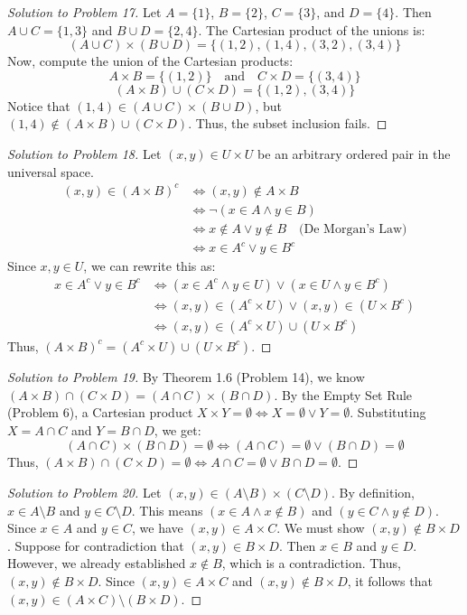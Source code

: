 \documentclass[11pt]{article}
\begin{document}
\begin{proof}[Solution to Problem 17]
Let $A = \{1\}$, $B = \{2\}$, $C = \{3\}$, and $D = \{4\}$.
Then $A \cup C = \{1, 3\}$ and $B \cup D = \{2, 4\}$.
The Cartesian product of the unions is:
\[ (A \cup C) \times (B \cup D) = \{(1,2), (1,4), (3,2), (3,4)\} \]
Now, compute the union of the Cartesian products:
\[ A \times B = \{(1,2)\} \quad \text{and} \quad C \times D = \{(3,4)\} \]
\[ (A \times B) \cup (C \times D) = \{(1,2), (3,4)\} \]
Notice that $(1,4) \in (A \cup C) \times (B \cup D)$, but $(1,4) \notin (A \times B) \cup (C \times D)$. Thus, the subset inclusion fails.
\end{proof}

\begin{proof}[Solution to Problem 18]
Let $(x,y) \in U \times U$ be an arbitrary ordered pair in the universal space.
\begin{align*}
(x,y) \in (A \times B)^c &\iff (x,y) \notin A \times B \\
&\iff \neg(x \in A \land y \in B) \\
&\iff x \notin A \lor y \notin B \quad \text{(De Morgan's Law)} \\
&\iff x \in A^c \lor y \in B^c
\end{align*}
Since $x, y \in U$, we can rewrite this as:
\begin{align*}
x \in A^c \lor y \in B^c &\iff (x \in A^c \land y \in U) \lor (x \in U \land y \in B^c) \\
&\iff (x,y) \in (A^c \times U) \lor (x,y) \in (U \times B^c) \\
&\iff (x,y) \in (A^c \times U) \cup (U \times B^c)
\end{align*}
Thus, $(A \times B)^c = (A^c \times U) \cup (U \times B^c)$.
\end{proof}

\begin{proof}[Solution to Problem 19]
By Theorem 1.6 (Problem 14), we know $(A \times B) \cap (C \times D) = (A \cap C) \times (B \cap D)$.
By the Empty Set Rule (Problem 6), a Cartesian product $X \times Y = \emptyset \iff X = \emptyset \lor Y = \emptyset$.
Substituting $X = A \cap C$ and $Y = B \cap D$, we get:
\[ (A \cap C) \times (B \cap D) = \emptyset \iff (A \cap C) = \emptyset \lor (B \cap D) = \emptyset \]
Thus, $(A \times B) \cap (C \times D) = \emptyset \iff A \cap C = \emptyset \lor B \cap D = \emptyset$.
\end{proof}

\begin{proof}[Solution to Problem 20]
Let $(x,y) \in (A \setminus B) \times (C \setminus D)$. 
By definition, $x \in A \setminus B$ and $y \in C \setminus D$.
This means $(x \in A \land x \notin B)$ and $(y \in C \land y \notin D)$.
Since $x \in A$ and $y \in C$, we have $(x,y) \in A \times C$.
We must show $(x,y) \notin B \times D$. Suppose for contradiction that $(x,y) \in B \times D$. Then $x \in B$ and $y \in D$. However, we already established $x \notin B$, which is a contradiction. Thus, $(x,y) \notin B \times D$.
Since $(x,y) \in A \times C$ and $(x,y) \notin B \times D$, it follows that $(x,y) \in (A \times C) \setminus (B \times D)$.
\end{proof}
\end{document}
